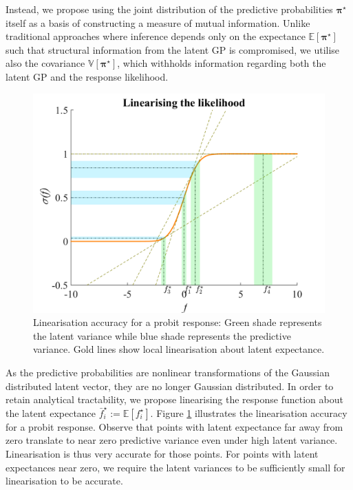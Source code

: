\documentclass{article}
\renewcommand{\vec}[1]{\boldsymbol{#1}}
\begin{document}
		Instead, we propose using the joint distribution of the predictive probabilities $\vec{\pi^{\star}}$ itself as a basis of constructing a measure of mutual information. Unlike traditional approaches where inference depends only on the expectance $\mathbb{E}[\vec{\pi^{\star}}]$ such that structural information from the latent GP is compromised, we utilise also the covariance $\mathbb{V}[\vec{\pi^{\star}}]$, which withholds information regarding both the latent GP and the response likelihood.
	
		\begin{figure}[!htbp]
			\centering
				\includegraphics[width = \linewidth]{Figures/linearisation.png}
			\caption{Linearisation accuracy for a probit response: Green shade represents the latent variance while blue shade represents the predictive variance. Gold lines show local linearisation about latent expectance.}
			\label{Figure:Linearisation}
		\end{figure}
			
		As the predictive probabilities are nonlinear transformations of the Gaussian distributed latent vector, they are no longer Gaussian distributed. In order to retain analytical tractability, we propose linearising the response function about the latent expectance $\bar{f}^{\star}_{i} := \mathbb{E}[f^{\star}_{i}]$. Figure \ref{Figure:Linearisation} illustrates the linearisation accuracy for a probit response. Observe that points with latent expectance far away from zero translate to near zero predictive variance even under high latent variance. Linearisation is thus very accurate for those points. For points with latent expectances near zero, we require the latent variances to be sufficiently small for linearisation to be accurate.
\end{document}
